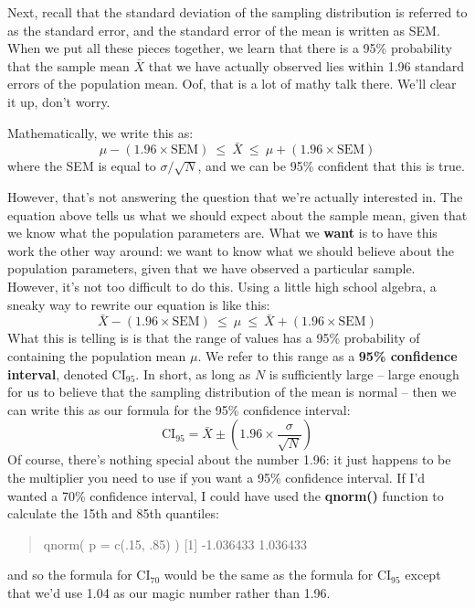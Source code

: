 \documentclass[
  letterpaper,
  DIV=11,
  numbers=noendperiod]{scrreprt}
\begin{document}
Next, recall that the standard deviation of the sampling distribution is
referred to as the standard error, and the standard error of the mean is
written as SEM. When we put all these pieces together, we learn that
there is a 95\% probability that the sample mean \(\bar{X}\) that we
have actually observed lies within 1.96 standard errors of the
population mean. Oof, that is a lot of mathy talk there. We'll clear it
up, don't worry.

Mathematically, we write this as:
\[\mu - \left( 1.96 \times \mbox{SEM} \right) \ \leq \  \bar{X}\  \leq \  \mu + \left( 1.96 \times \mbox{SEM} \right)\]
where the SEM is equal to \(\sigma / \sqrt{N}\), and we can be 95\%
confident that this is true.

However, that's not answering the question that we're actually
interested in. The equation above tells us what we should expect about
the sample mean, given that we know what the population parameters are.
What we \textbf{want} is to have this work the other way around: we want
to know what we should believe about the population parameters, given
that we have observed a particular sample. However, it's not too
difficult to do this. Using a little high school algebra, a sneaky way
to rewrite our equation is like this:
\[\bar{X} -  \left( 1.96 \times \mbox{SEM} \right) \ \leq \ \mu  \ \leq  \ \bar{X} +  \left( 1.96 \times \mbox{SEM}\right)\]
What this is telling is is that the range of values has a 95\%
probability of containing the population mean \(\mu\). We refer to this
range as a \textbf{95\% confidence interval}, denoted
\(\mbox{CI}_{95}\). In short, as long as \(N\) is sufficiently large --
large enough for us to believe that the sampling distribution of the
mean is normal -- then we can write this as our formula for the 95\%
confidence interval:
\[\mbox{CI}_{95} = \bar{X} \pm \left( 1.96 \times \frac{\sigma}{\sqrt{N}} \right)\]
Of course, there's nothing special about the number 1.96: it just
happens to be the multiplier you need to use if you want a 95\%
confidence interval. If I'd wanted a 70\% confidence interval, I could
have used the \textbf{qnorm()} function to calculate the 15th and 85th
quantiles:

\begin{quote}
qnorm( p = c(.15, .85) ) {[}1{]} -1.036433 1.036433
\end{quote}

and so the formula for \(\mbox{CI}_{70}\) would be the same as the
formula for \(\mbox{CI}_{95}\) except that we'd use 1.04 as our magic
number rather than 1.96.
\end{document}
